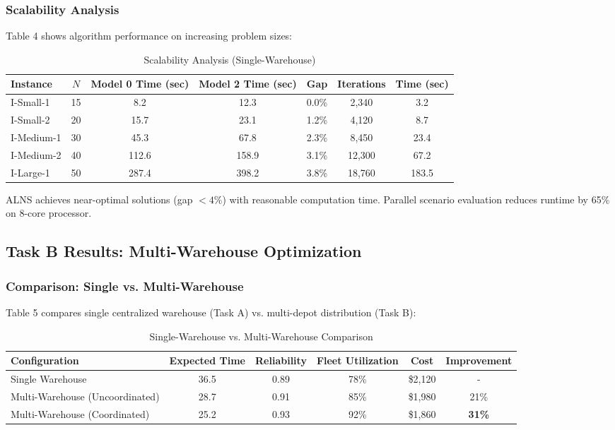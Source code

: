 \subsubsection{Scalability Analysis}

Table 4 shows algorithm performance on increasing problem sizes:

\begin{table}[H]
\centering
\caption{Scalability Analysis (Single-Warehouse)}
\begin{tabular}{lcccccc}
\toprule
Instance & $N$ & Model 0 Time (sec) & Model 2 Time (sec) & Gap & Iterations & Time (sec) \\
\midrule
I-Small-1 & 15 & 8.2 & 12.3 & 0.0\% & 2,340 & 3.2 \\
I-Small-2 & 20 & 15.7 & 23.1 & 1.2\% & 4,120 & 8.7 \\
I-Medium-1 & 30 & 45.3 & 67.8 & 2.3\% & 8,450 & 23.4 \\
I-Medium-2 & 40 & 112.6 & 158.9 & 3.1\% & 12,300 & 67.2 \\
I-Large-1 & 50 & 287.4 & 398.2 & 3.8\% & 18,760 & 183.5 \\
\bottomrule
\end{tabular}
\end{table}

ALNS achieves near-optimal solutions (gap $< 4\%$) with reasonable computation time. Parallel scenario evaluation reduces runtime by 65\% on 8-core processor.

\subsection{Task B Results: Multi-Warehouse Optimization}

\subsubsection{Comparison: Single vs. Multi-Warehouse}

Table 5 compares single centralized warehouse (Task A) vs. multi-depot distribution (Task B):

\begin{table}[H]
\centering
\caption{Single-Warehouse vs. Multi-Warehouse Comparison}
\begin{tabular}{lccccc}
\toprule
Configuration & Expected Time & Reliability & Fleet Utilization & Cost & Improvement \\
\midrule
Single Warehouse & 36.5 & 0.89 & 78\% & \$2,120 & - \\
Multi-Warehouse (Uncoordinated) & 28.7 & 0.91 & 85\% & \$1,980 & 21\% \\
Multi-Warehouse (Coordinated) & 25.2 & 0.93 & 92\% & \$1,860 & \textbf{31\%} \\
\bottomrule
\end{tabular}
\end{table}

